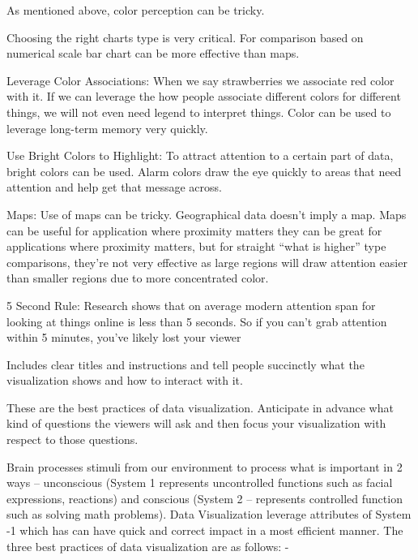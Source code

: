 \documentclass[]{book}
\theoremstyle{definition}
\theoremstyle{definition}
\theoremstyle{definition}
\theoremstyle{remark}
\begin{document}
As mentioned above, color perception can be tricky.

Choosing the right charts type is very critical. For comparison based on
numerical scale bar chart can be more effective than maps.

Leverage Color Associations: When we say strawberries we associate red
color with it. If we can leverage the how people associate different
colors for different things, we will not even need legend to interpret
things. Color can be used to leverage long-term memory very quickly.

Use Bright Colors to Highlight: To attract attention to a certain part
of data, bright colors can be used. Alarm colors draw the eye quickly to
areas that need attention and help get that message across.

Maps: Use of maps can be tricky. Geographical data doesn't imply a map.
Maps can be useful for application where proximity matters they can be
great for applications where proximity matters, but for straight ``what
is higher'' type comparisons, they're not very effective as large
regions will draw attention easier than smaller regions due to more
concentrated color.

5 Second Rule: Research shows that on average modern attention span for
looking at things online is less than 5 seconds. So if you can't grab
attention within 5 minutes, you've likely lost your viewer

Includes clear titles and instructions and tell people succinctly what
the visualization shows and how to interact with it.

These are the best practices of data visualization. Anticipate in
advance what kind of questions the viewers will ask and then focus your
visualization with respect to those questions.

Brain processes stimuli from our environment to process what is
important in 2 ways -- unconscious (System 1 represents uncontrolled
functions such as facial expressions, reactions) and conscious (System 2
-- represents controlled function such as solving math problems). Data
Visualization leverage attributes of System -1 which has can have quick
and correct impact in a most efficient manner. The three best practices
of data visualization are as follows: -
\end{document}
